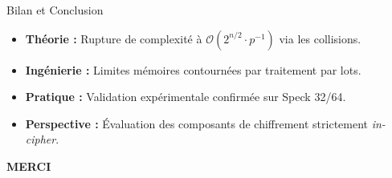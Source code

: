 \begin{frame}{Bilan et Conclusion}

    \vspace{0.5cm}

    \begin{itemize}
        \item \textbf{Théorie :} Rupture de complexité à $\mathcal{O}(2^{n/2} \cdot p^{-1})$ via les collisions.
        
        \vspace{0.6cm}
        \item \textbf{Ingénierie :} Limites mémoires contournées par traitement par lots.
        
        \vspace{0.6cm}
        \item \textbf{Pratique :} Validation expérimentale confirmée sur Speck 32/64.
        
        \vspace{0.6cm}
        \item \textbf{Perspective :} Évaluation des composants de chiffrement strictement \textit{in-cipher}.
    \end{itemize}

\end{frame}

\begin{frame}

\begin{center}

\vspace{2cm}

\Huge \textbf{MERCI}

\vspace{1.5cm}


\end{center}

\end{frame}
